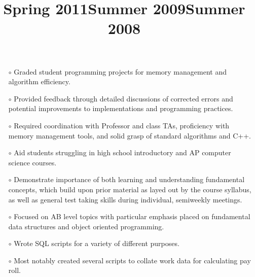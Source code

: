 \begin{resume}
\title{Spring 2011}
\begin{position}
\vspace{-10pt}
\begin{itemize}\setlength{\itemsep}{-0.5mm}
\item[$\circ$] Graded student programming projects for memory management and algorithm efficiency. 
\item[$\circ$] Provided feedback through detailed discussions of corrected errors and potential improvements to implementations and programming practices. 
\item[$\circ$] Required coordination with Professor and class TAs, proficiency with memory management tools, and solid grasp of standard algorithms and C++. 
\end{itemize}
\end{position}

\title{Summer 2009}
\begin{position}
\vspace{-10pt}
\begin{itemize}\setlength{\itemsep}{-0.5mm}
\item[$\circ$] Aid students struggling in high school introductory and AP computer science courses. 
\item[$\circ$] Demonstrate importance of both learning and understanding fundamental concepts, which build upon prior material as layed out by the course syllabus, as well as general test taking skills during individual, semiweekly meetings.
\item[$\circ$] Focused on AB level topics with particular emphasis placed on fundamental data structures and object oriented programming.
\end{itemize}
\end{position}

\title{Summer 2008}
\begin{position}
\vspace{-10pt}
\begin{itemize}\setlength{\itemsep}{-0.5mm}
\item[$\circ$] Wrote SQL scripts for a variety of different purposes.
\item[$\circ$] Most notably created several scripts to collate work data for calculating pay roll.
\end{itemize}
\end{position}


\end{resume}
